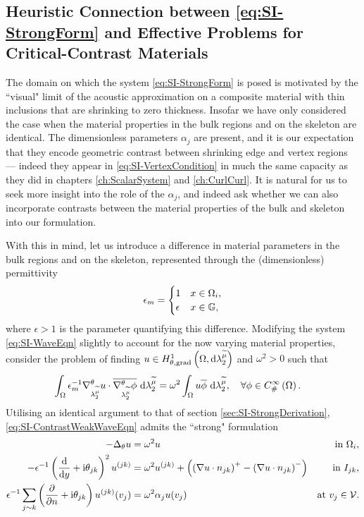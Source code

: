 \subsection{Heuristic Connection between \eqref{eq:SI-StrongForm} and Effective Problems for Critical-Contrast Materials} \label{ssec:SI-DoubleLimitReconcile}
The domain on which the system \eqref{eq:SI-StrongForm} is posed is motivated by the ``visual" limit of the acoustic approximation on a composite material with thin inclusions that are shrinking to zero thickness.
Insofar we have only considered the case when the material properties in the bulk regions and on the skeleton are identical.
The dimensionless parameters $\alpha_j$ are present, and it is our expectation that they encode geometric contrast between shrinking edge and vertex regions --- indeed they appear in \eqref{eq:SI-VertexCondition} in much the same capacity as they did in chapters \ref{ch:ScalarSystem} and \ref{ch:CurlCurl}.
It is natural for us to seek more insight into the role of the $\alpha_j$, and indeed ask whether we can also incorporate contrasts between the material properties of the bulk and skeleton into our formulation.

With this in mind, let us introduce a difference in material parameters in the bulk regions and on the skeleton, represented through the (dimensionless) permittivity
\begin{align*}
	\epsilon_m =
	\begin{cases} 1 & x\in\Omega_i, \\ \epsilon & x\in\mathbb{G}, \end{cases}
\end{align*}
where $\epsilon > 1$ is the parameter quantifying this difference.
Modifying the system \eqref{eq:SI-WaveEqn} slightly to account for the now varying material properties, consider the problem of finding $u\in H^1_{\theta, \mathrm{grad}}\left( \Omega, \mathrm{d}\lambda_2^{\widetilde{\mu}} \right)$ and $\omega^2>0$ such that
\begin{align} \label{eq:SI-ContrastWeakWaveEqn}
	\int_{\Omega} \epsilon_m^{-1}\nabla^{\theta}_{\lambda_2^{\widetilde{\mu}}}u\cdot\overline{\nabla^{\theta}_{\lambda_2^{\widetilde{\mu}}}\phi}  \ \mathrm{d}\lambda_2^{\widetilde{\mu}}
	&= \omega^2 \int_{\Omega} u\overline{\phi}  \ \mathrm{d}\lambda_2^{\widetilde{\mu}}, \quad\forall\phi\in C^{\infty}_{\#}\left( \Omega \right).
\end{align}
Utilising an identical argument to that of section \ref{sec:SI-StrongDerivation}, \eqref{eq:SI-ContrastWeakWaveEqn} admits the ``strong" formulation
\begin{subequations}
	\begin{align*}
		-\Delta_\theta u 
		&= \omega^2 u 
		&\text{in } \Omega_i, \\
		- \epsilon^{-1}\left( \dfrac{\mathrm{d}}{\mathrm{d}y} + \mathrm{i}\theta_{jk} \right)^2u^{(jk)}  
		&= \omega^2 u^{(jk)} + \left( \left( \nabla u\cdot n_{jk} \right)^+ - \left( \nabla u\cdot n_{jk} \right)^- \right)
		&\text{in } I_{jk}, \\
		\epsilon^{-1}\sum_{j\sim k} \left( \dfrac{\partial }{\partial n}+\mathrm{i}\theta_{jk} \right) u^{(jk)}(v_j) 
		&= \omega^2 \alpha_j u(v_j)
		&\text{at } v_j\in\mathcal{V}.
	\end{align*}
\end{subequations}


